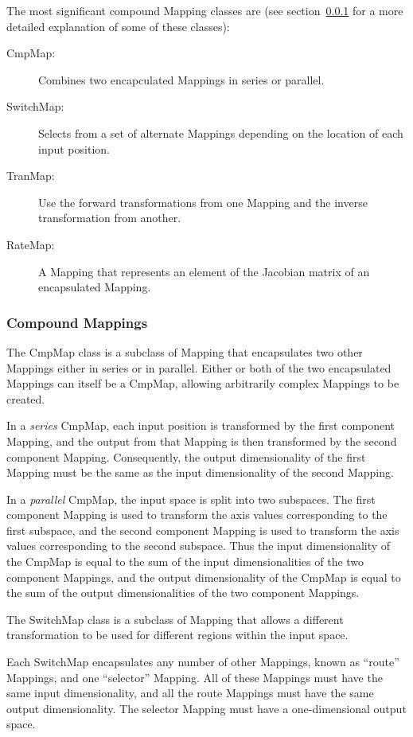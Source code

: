 \documentclass[final,authoryear,5p,times,twocolumn]{elsarticle}
\begin{document}
The most significant compound Mapping classes are (see
section~\ref{sec:cmpmap} for a more detailed explanation of some of these
classes):

\begin{description}
\item[CmpMap:] Combines two encapculated Mappings in series or parallel.
\item[SwitchMap:] Selects from a set of alternate Mappings depending on
the location of each input position.
\item[TranMap:] Use the forward transformations from one Mapping and the
inverse transformation from another.
\item[RateMap:] A Mapping that represents an element of the Jacobian
matrix of an encapsulated Mapping.
\end{description}

\subsubsection{Compound Mappings}
\label{sec:cmpmap}

The CmpMap class is a subclass of Mapping that encapsulates two other
Mappings either in series or in parallel. Either or both of the two
encapsulated Mappings can itself be a CmpMap, allowing arbitrarily complex
Mappings to be created.

In a \emph{series} CmpMap, each input position is transformed by the
first component Mapping, and the output from that Mapping is then
transformed by the second component Mapping. Consequently, the output
dimensionality of the first Mapping must be the same as the input
dimensionality of the second Mapping.

In a \emph{parallel} CmpMap, the input space is split into two subspaces.
The first component Mapping is used to transform the axis values
corresponding to the first subspace, and the second component Mapping is
used to transform the axis values corresponding to the second subspace.
Thus the input dimensionality of the CmpMap is equal to the sum of the
input dimensionalities of the two component Mappings, and the output
dimensionality of the CmpMap is equal to the sum of the output
dimensionalities of the two component Mappings.

The SwitchMap class is a subclass of Mapping that allows a different
transformation to be used for different regions within the input space.

Each SwitchMap encapsulates any number of other Mappings, known as ``route''
Mappings, and one ``selector'' Mapping. All of these Mappings must have the
same input dimensionality, and all the route Mappings must have the same
output dimensionality. The selector Mapping must have a one-dimensional
output space.
\end{document}
